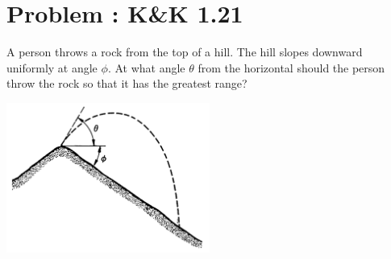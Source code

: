 \documentclass[problems]{esg8012pset}
\begin{document}
\section{Problem \thesection: K\&K 1.21}
  A person throws a rock from the top of a hill. The hill slopes downward uniformly at angle $\phi$. At
  what angle $\theta$ from the horizontal should the person throw the rock so that it has the greatest
  range?
  \begin{center}\includegraphics[width=0.5\textwidth]{ps01_4}\end{center}
\end{document}

